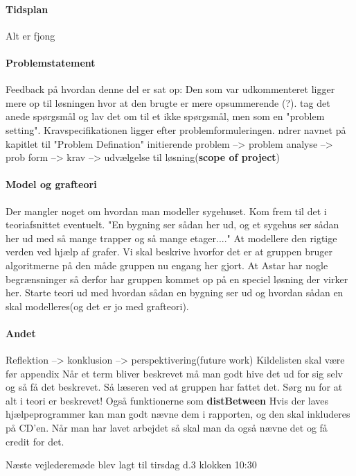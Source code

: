 \documentclass[article,11pt]{memoir}
\begin{document}
\paragraph{Tidsplan}
Alt er fjong


\paragraph{Problemstatement}
Feedback på hvordan denne del er sat op: Den som var udkommenteret ligger mere op til løsningen hvor at den brugte er mere opsummerende (?). tag det anede spørgsmål og lav det om til et ikke spørgsmål, men som en "problem setting". 
Kravspecifikationen ligger efter problemformuleringen.
ndrer navnet på kapitlet til "Problem Defination"
initierende problem --> problem analyse --> prob form --> krav --> udvælgelse til løsning(\textbf{scope of project})


\paragraph{Model og grafteori}
Der mangler noget om hvordan man modeller sygehuset. Kom frem til det i teoriafsnittet eventuelt.
"En bygning ser sådan her ud, og et sygehus ser sådan her ud med så mange trapper og så mange etager...."
At modellere den rigtige verden ved hjælp af grafer.
Vi skal beskrive hvorfor det er at gruppen bruger algoritmerne på den måde gruppen nu engang her gjort. At Astar har nogle begrænsninger så derfor har gruppen kommet op på en speciel løsning der virker her.
Starte teori ud med hvordan sådan en bygning ser ud og hvordan sådan en skal modelleres(og det er jo med grafteori).


\paragraph{Andet}
Reflektion --> konklusion --> perspektivering(future work)
Kildelisten skal være før appendix
Når et term bliver beskrevet må man godt hive det ud for sig selv og så få det beskrevet. Så læseren ved at gruppen har fattet det.
Sørg nu for at alt i teori er beskrevet! Også funktionerne som \textbf{distBetween}
Hvis der laves hjælpeprogrammer kan man godt nævne dem i rapporten, og den skal inkluderes på CD'en. Når man har lavet arbejdet så skal man da også nævne det og få credit for det.



Næste vejlederemøde blev lagt til tirsdag d.3 klokken 10:30
\end{document}
